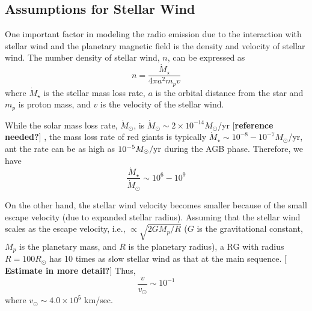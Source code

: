 \documentclass{emulateapj}
\def\memoYF#1{\color{red}$[${\bf #1}$]$ \color{black}}
\def\memoDS#1{\color{blue}$[${\bf #1}$]$ \color{black}}
\begin{document}
\subsection{Assumptions for Stellar Wind}
\label{ss:stellarwind}

One important factor in modeling the radio emission due to the interaction with stellar wind and the planetary magnetic field is the density and velocity of stellar wind. 
The number density of stellar wind, $n$, can be expressed as
\begin{equation}
n = \frac{\dot M_{\star }}{4\pi a^2 m_p v}
\end{equation}
where $\dot M_{\star }$ is the stellar mass loss rate, $a$ is the orbital distance from the star and $m_p$ is proton mass, and $v$ is the velocity of the stellar wind. 

While the solar mass loss rate, $\dot M_{\odot }$, is $\dot M_{\odot } \sim 2\times 10^{-14} M_{\odot}$/yr \memoYF{reference needed?}, the mass loss rate of red giants is typically $\dot M_{\star } \sim 10^{-8}-10^{-7} M_{\odot}$/yr, ant the rate can be as high as $10^{-5} M_\odot{\rm /yr}$ during the AGB phase. 
Therefore, we have
\begin{equation}
\frac{\dot M_{\star }}{\dot M_{\odot}} \sim 10^6 - 10^9
\end{equation}

On the other hand, the stellar wind velocity becomes smaller because of the small escape velocity (due to expanded stellar radius).
Assuming that the stellar wind scales as the escape velocity, i.e., $\propto \sqrt{2GM_p/R}$ ($G$ is the gravitational constant, $M_p$ is the planetary mass, and $R$ is the planetary radius), a RG with radius $R=100R_{\odot}$ has 10 times as slow stellar wind as that at the main sequence. \memoYF{Estimate in more detail?} Thus, 
\begin{equation}
\frac{v}{v_{\odot}} \sim 10^{-1}
\end{equation}
where $v_{\odot} \sim 4.0 \times 10^5 $ km/sec. 

\end{document}

